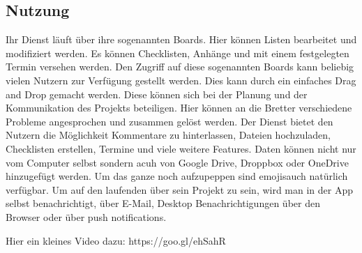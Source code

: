 \subsection{Nutzung}
Ihr Dienst läuft über ihre sogenannten Boards. Hier können Listen bearbeitet und modifiziert werden. Es können Checklisten, Anhänge und mit einem festgelegten Termin versehen werden. Den Zugriff auf diese sogenannten Boards kann beliebig vielen Nutzern zur Verfügung gestellt werden. Dies kann durch ein einfaches Drag and Drop gemacht werden. Diese können sich bei der Planung und der Kommunikation des Projekts beteiligen. Hier können an die Bretter verschiedene Probleme angesprochen und zusammen gelöst werden. Der Dienst bietet den Nutzern die Möglichkeit Kommentare zu hinterlassen, Dateien hochzuladen, Checklisten erstellen, Termine und viele weitere Features.
Daten können nicht nur vom Computer selbst sondern acuh von Google Drive, Droppbox oder OneDrive hinzugefügt werden. Um das ganze noch aufzupeppen sind \glqq emojis\grqq \space auch natürlich verfügbar. Um auf den laufenden über sein Projekt zu sein, wird man in der App selbst benachrichtigt, über E-Mail, Desktop Benachrichtigungen über den Browser oder über \glqq push notifications\grqq.

Hier ein kleines Video dazu: https://goo.gl/ehSahR

